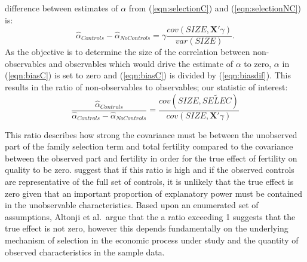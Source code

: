 \documentclass{article}[11pt,subeqn]
\newcommand{\vect}[1]{\mathbf{#1}}
\begin{document}
\begin{spacing}{1.5}
difference between estimates of $\alpha$ from (\ref{eqn:selectionC}) and (\ref{eqn:selectionNC}) is:
\begin{equation}
 \label{eqn:biasdif}
\hat\alpha_{Controls} - \hat\alpha_{NoControls} = \gamma\frac{cov(SIZE,\vect{X}'\gamma)}{var(SIZE)}.
\end{equation}
As the objective is to determine the size of the correlation between non-observables and observables which would drive the estimate of $\alpha$ to zero, $\alpha$ in (\ref{eqn:biasC})
is set to zero and (\ref{eqn:biasC}) is divided by (\ref{eqn:biasdif}).  This results in the ratio of non-observables to observables; our statistic of interest:
\begin{equation}
 \label{eqn:Aratio}
\frac{\hat\alpha_{Controls}}{\hat\alpha_{Controls} - \hat\alpha_{NoControls}}=\frac{cov(SIZE,\widetilde{SELEC})}{cov(SIZE,\vect{X}'\gamma)}
\end{equation}

This ratio describes how strong the covariance must be between the unobserved part of the family selection term and total fertility compared to the covariance between the observed
part and fertility in order for the true effect of fertility on quality to be zero.  \citet{Altonjietal2005} suggest that if this ratio is high and if the observed controls are
representative of the full set of controls, it is unlikely that the true effect is zero given that an important proportion of explanatory power must be contained in the unobservable 
characteristics.  Based upon an enumerated set of assumptions, Altonji et al.\ argue that the a ratio exceeding 1 suggests that the true effect is not zero, however this depends 
fundamentally on the underlying mechanism of selection in the economic process under study and the quantity of observed characteristics in the sample data.


\end{spacing}
\end{document}
